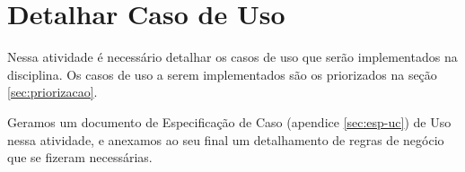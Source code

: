 \section{Detalhar Caso de Uso}

Nessa atividade é necessário detalhar os casos de uso que serão implementados na disciplina. Os casos de uso a serem implementados são os priorizados na seção \ref{sec:priorizacao}.

Geramos um documento de Especificação de Caso (apendice \ref{sec:esp-uc}) de Uso nessa atividade, e anexamos ao seu final um detalhamento de regras de negócio que se fizeram necessárias.
